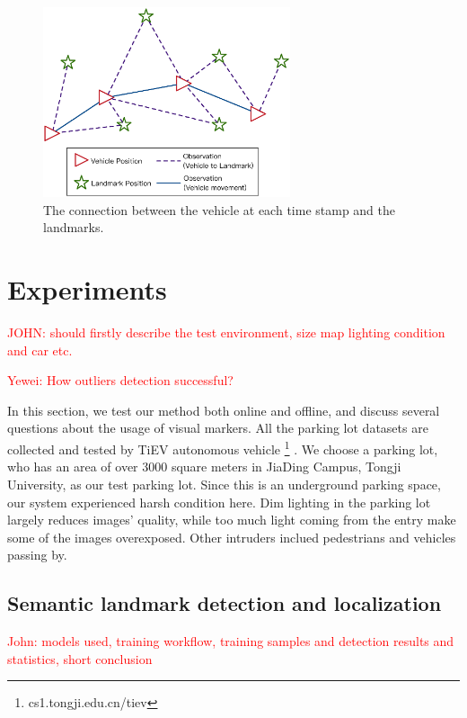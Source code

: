 \documentclass[journal]{IEEEtran}
\newcommand{\COMMENT}[1]{\textcolor{red}{#1}}
\begin{document}
\begin{figure}
\centering
\includegraphics[height = 2.2in]{pic/fig9_Optimize}
\caption{
The connection between the vehicle at each time stamp and the landmarks.
}\label{fig:9}
\end{figure}



\section{Experiments}
\COMMENT{JOHN: should firstly describe the test environment, size map lighting condition and car etc.}

\COMMENT{Yewei: How outliers detection successful?}

In this section, we test our method both online and offline, and discuss several questions about the usage of visual markers. 
All the parking lot datasets are collected and tested by TiEV autonomous vehicle \footnote{cs1.tongji.edu.cn/tiev} .
We choose a parking lot, who has an area of over 3000 square meters in JiaDing Campus, Tongji University, as our test parking lot.
Since this is an underground parking space, our system experienced harsh condition here.
Dim lighting in the parking lot largely reduces images' quality, while too much light coming from the entry make some of the images overexposed.
Other intruders inclued pedestrians and vehicles passing by.

\subsection{Semantic landmark detection and localization}
\COMMENT{John: models used, training workflow, training samples and detection results and statistics, short conclusion}
\end{document}
